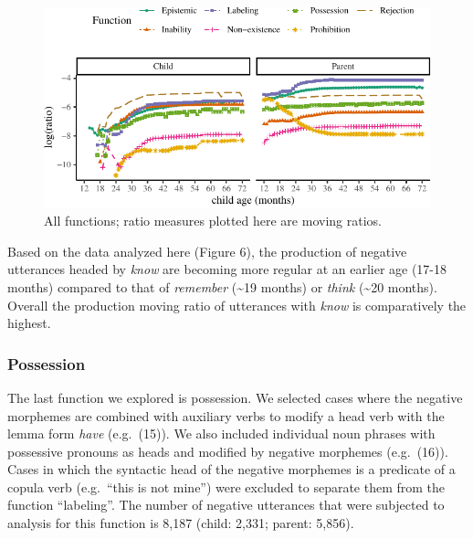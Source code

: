 \documentclass[10pt, letterpaper]{article}
\newenvironment{CodeChunk}{}{}
\begin{document}
\begin{figure}[h!]

\begin{CodeChunk}


\begin{center}\includegraphics{figs/all-1} \end{center}

\end{CodeChunk}

\caption[This image spans both columns]{All functions; ratio measures plotted here are moving ratios.}\label{fig:all}
\end{figure}

Based on the data analyzed here (Figure 6), the production of negative
utterances headed by \emph{know} are becoming more regular at an earlier
age (17-18 months) compared to that of \emph{remember}
(\textasciitilde19 months) or \emph{think} (\textasciitilde20 months).
Overall the production moving ratio of utterances with \emph{know} is
comparatively the highest.

\hypertarget{possession}{%
\subsubsection{Possession}\label{possession}}

The last function we explored is possession. We selected cases where the
negative morphemes are combined with auxiliary verbs to modify a head
verb with the lemma form \emph{have} (e.g.~(15)). We also included
individual noun phrases with possessive pronouns as heads and modified
by negative morphemes (e.g.~(16)). Cases in which the syntactic head of
the negative morphemes is a predicate of a copula verb (e.g.~``this is
not mine'') were excluded to separate them from the function
``labeling''. The number of negative utterances that were subjected to
analysis for this function is 8,187 (child: 2,331; parent: 5,856).
\end{document}
